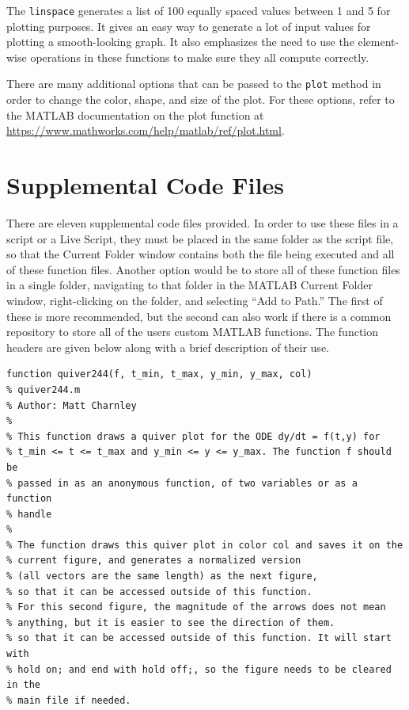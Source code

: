 \documentclass{ximera}
\begin{document}
The \texttt{linspace} generates a list of 100 equally spaced values between 1 and 5 for plotting purposes. It gives an easy way to generate a lot of input values for plotting a smooth-looking graph. It also emphasizes the need to use the element-wise operations in these functions to make sure they all compute correctly. 

There are many additional options that can be passed to the \texttt{plot} method in order to change the color, shape, and size of the plot. For these options, refer to the MATLAB documentation on the plot function at \url{https://www.mathworks.com/help/matlab/ref/plot.html}.

\section{Supplemental Code Files}

There are eleven supplemental code files provided. In order to use these files in a script or a Live Script, they must be placed in the same folder as the script file, so that the Current Folder window contains both the file being executed and all of these function files. Another option would be to store all of these function files in a single folder, navigating to that folder in the MATLAB Current Folder window, right-clicking on the folder, and selecting ``Add to Path.'' The first of these is more recommended, but the second can also work if there is a common repository to store all of the users custom MATLAB functions. The function headers are given below along with a brief description of their use.

\begin{verbatim}
function quiver244(f, t_min, t_max, y_min, y_max, col)
% quiver244.m
% Author: Matt Charnley
%
% This function draws a quiver plot for the ODE dy/dt = f(t,y) for
% t_min <= t <= t_max and y_min <= y <= y_max. The function f should be
% passed in as an anonymous function, of two variables or as a function
% handle
%
% The function draws this quiver plot in color col and saves it on the 
% current figure, and generates a normalized version
% (all vectors are the same length) as the next figure,
% so that it can be accessed outside of this function.
% For this second figure, the magnitude of the arrows does not mean
% anything, but it is easier to see the direction of them. 
% so that it can be accessed outside of this function. It will start with
% hold on; and end with hold off;, so the figure needs to be cleared in the
% main file if needed.
\end{verbatim}
\end{document}
